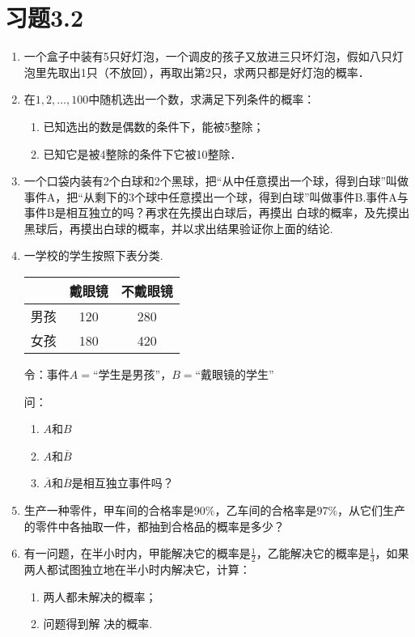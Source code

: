 \section*{习题3.2}
\begin{enumerate}
    \item 一个盒子中装有5只好灯泡，一个调皮的孩子又放进三只坏灯泡，假如八只灯泡里先取出1只（不放回），再取出第2只，求两只都是好灯泡的概率．
    \item 在$1,2,\ldots,100$中随机选出一个数，求满足下列条件的概率：
\begin{enumerate}[(1)]
\item 已知选出的数是偶数的条件下，能被5整除；
\item 已知它是被4整除的条件下它被10整除．
\end{enumerate}

\item 一个口袋内装有2个白球和2个黑球，把“从中任意摸出一个球，得到白球”叫做事件A，把“从剩下的3个球中任意摸出一个球，得到白球”叫做事件B.事件A与事件B是相互独立的吗？再求在先摸出白球后，再摸出 白球的概率，及先摸出黑球后，再摸出白球的概率，并以求出结果验证你上面的结论.
\item 一学校的学生按照下表分类.
\begin{center}
\begin{tabular}{c|cc}
    \hline
   & 戴眼镜&    不戴眼镜\\
   \hline
    男孩&    120&    280\\
    女孩&    180& 420   \\
    \hline
\end{tabular}
\end{center}
令：事件$A=$“学生是男孩”，$B=$“戴眼镜的学生” 

问：
\begin{multicols}{2}
  \begin{enumerate}[(1)]
    \item $A$和$B$
    \item $A$和$\overline{B}$
    \item $\overline{A}$和$\overline{B}$是相互独立事件吗？
\end{enumerate}  
\end{multicols}

\item 生产一种零件，甲车间的合格率是90\%，乙车间的合格率是97\%，从它们生产的零件中各抽取一件，都抽到合格品的概率是多少？
\item 有一问题，在半小时内，甲能解决它的概率是$\frac{1}{2}$，乙能解决它的概率是$\frac{1}{3}$，如果两人都试图独立地在半小时内解决它，计算：
\begin{multicols}{2}
\begin{enumerate}[(1)]
\item 两人都未解决的概率；    \item 问题得到解
决的概率.
\end{enumerate}
\end{multicols}


\end{enumerate}
